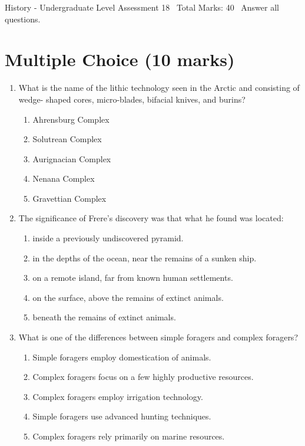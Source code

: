 \documentclass[12pt]{article}
\begin{document}
\begin{center}
History - Undergraduate Level Assessment 18 \
Total Marks: 40 \
Answer all questions.
\end{center}

\section*{Multiple Choice (10 marks)}
\begin{enumerate}[label=\arabic*.]
\item What is the name of the lithic technology seen in the Arctic and consisting of wedge- shaped cores, micro-blades, bifacial knives, and burins?
\begin{enumerate}[label=(\alph*)]
    \item Ahrensburg Complex
    \item Solutrean Complex
    \item Aurignacian Complex
    \item Nenana Complex
    \item Gravettian Complex
\end{enumerate}
\item The significance of Frere's discovery was that what he found was located:
\begin{enumerate}[label=(\alph*)]
    \item inside a previously undiscovered pyramid.
    \item in the depths of the ocean, near the remains of a sunken ship.
    \item on a remote island, far from known human settlements.
    \item on the surface, above the remains of extinct animals.
    \item beneath the remains of extinct animals.
\end{enumerate}
\item What is one of the differences between simple foragers and complex foragers?
\begin{enumerate}[label=(\alph*)]
    \item Simple foragers employ domestication of animals.
    \item Complex foragers focus on a few highly productive resources.
    \item Complex foragers employ irrigation technology.
    \item Simple foragers use advanced hunting techniques.
    \item Complex foragers rely primarily on marine resources.

\end{enumerate}
\end{enumerate}
\end{document}
